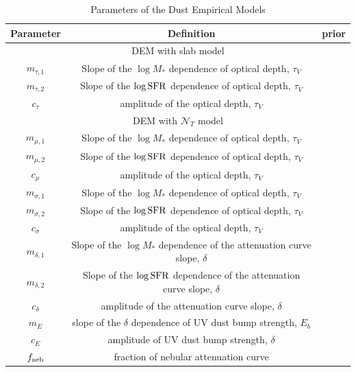 \begin{table}
    \caption{Parameters of the Dust Empirical Models}
    \begin{center}
        \begin{tabular}{ccc} \toprule
            Parameter & Definition & prior\\[3pt] \hline\hline
            \multicolumn{3}{c}{DEM with slab model}\\ \hline
            $m_{\tau,1}$ & Slope of the $\log M_*$ dependence of optical depth, $\tau_V$\\
            $m_{\tau,2}$ & Slope of the $\log {\rm SFR}$ dependence of optical depth, $\tau_V$\\
            $c_{\tau}$ & amplitude of the optical depth, $\tau_V$\\
            \hline
            \multicolumn{3}{c}{DEM with $\mathcal{N}_T$ model}\\ \hline
            $m_{\mu,1}$ & Slope of the $\log M_*$ dependence of optical depth, $\tau_V$\\
            $m_{\mu,2}$ & Slope of the $\log {\rm SFR}$ dependence of optical depth, $\tau_V$\\
            $c_{\mu}$ & amplitude of the optical depth, $\tau_V$\\ 
            $m_{\sigma,1}$ & Slope of the $\log M_*$ dependence of optical depth, $\tau_V$\\
            $m_{\sigma,2}$ & Slope of the $\log {\rm SFR}$ dependence of optical depth, $\tau_V$\\
            $c_{\sigma}$ & amplitude of the optical depth, $\tau_V$\\ 
            \hline
            $m_{\delta,1}$ & Slope of the $\log M_*$ dependence of the attenuation curve slope, $\delta$\\
            $m_{\delta,2}$ & Slope of the $\log {\rm SFR}$ dependence of the attenuation curve slope, $\delta$\\
            $c_{\delta}$ & amplitude of the attenuation curve slope, $\delta$\\
            $m_{E}$ & slope of the $\delta$ dependence of UV dust bump strength, $E_b$\\
            $c_{E}$ & amplitude of UV dust bump strength, $\delta$\\
            $f_{\rm neb}$ & fraction of nebular attenuation curve\\
            \hline
        \end{tabular} \label{tab:free_param}
    \end{center}
\end{table}

